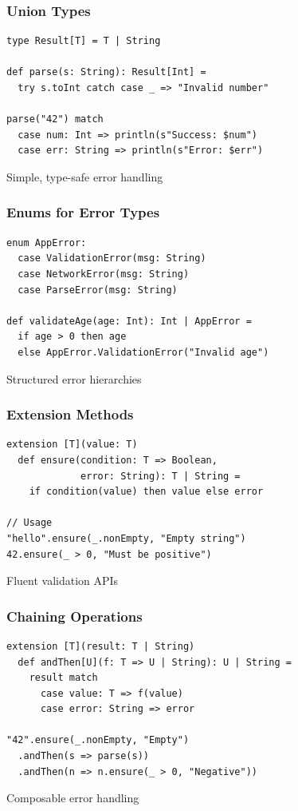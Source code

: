 \documentclass{beamer}
\begin{document}
\begin{frame}[fragile]
\frametitle{Union Types}

\begin{lstlisting}[style=scalaStyle]
type Result[T] = T | String

def parse(s: String): Result[Int] = 
  try s.toInt catch case _ => "Invalid number"

parse("42") match
  case num: Int => println(s"Success: $num")
  case err: String => println(s"Error: $err")
\end{lstlisting}

Simple, type-safe error handling

\end{frame}

\begin{frame}[fragile]
\frametitle{Enums for Error Types}

\begin{lstlisting}[style=scalaStyle]
enum AppError:
  case ValidationError(msg: String)
  case NetworkError(msg: String)
  case ParseError(msg: String)

def validateAge(age: Int): Int | AppError =
  if age > 0 then age 
  else AppError.ValidationError("Invalid age")
\end{lstlisting}

Structured error hierarchies

\end{frame}

\begin{frame}[fragile]
\frametitle{Extension Methods}

\begin{lstlisting}[style=scalaStyle]
extension [T](value: T)
  def ensure(condition: T => Boolean, 
             error: String): T | String =
    if condition(value) then value else error

// Usage
"hello".ensure(_.nonEmpty, "Empty string")
42.ensure(_ > 0, "Must be positive")
\end{lstlisting}

Fluent validation APIs

\end{frame}

\begin{frame}[fragile]
\frametitle{Chaining Operations}

\begin{lstlisting}[style=scalaStyle]
extension [T](result: T | String)
  def andThen[U](f: T => U | String): U | String = 
    result match
      case value: T => f(value)
      case error: String => error

"42".ensure(_.nonEmpty, "Empty")
  .andThen(s => parse(s))
  .andThen(n => n.ensure(_ > 0, "Negative"))
\end{lstlisting}

Composable error handling

\end{frame}
\end{document}
